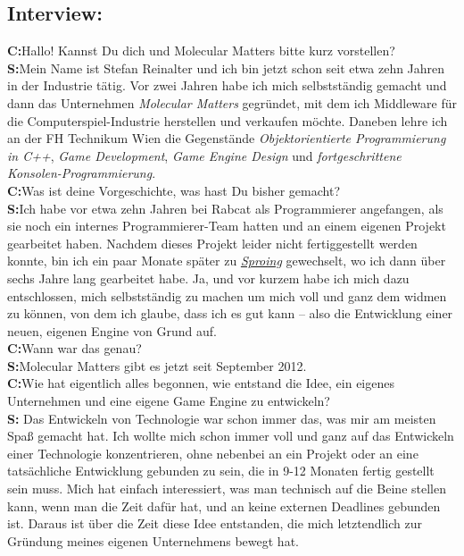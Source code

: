\documentclass[10pt,a4paper,ngerman,twoside]{article} %
\begin{document}
\subsection*{Interview:}
\textbf{C:}Hallo! Kannst Du dich und Molecular Matters bitte kurz vorstellen? \\
\textbf{S:}Mein Name ist Stefan Reinalter und ich bin jetzt schon seit etwa zehn Jahren in der Industrie tätig. Vor zwei Jahren habe ich mich selbstständig gemacht und dann das Unternehmen \textit{Molecular Matters} gegründet, mit dem ich Middleware für die Computerspiel-Industrie herstellen und verkaufen möchte. Daneben lehre ich an der FH Technikum Wien die Gegenstände \textit{Objektorientierte Programmierung in C++},  \textit{Game Development}, \textit{Game Engine Design} und \textit{fortgeschrittene Konsolen-Programmierung}. \\
\textbf{C:}Was ist deine Vorgeschichte, was hast Du bisher gemacht? \\
\textbf{S:}Ich habe vor etwa zehn Jahren bei Rabcat als Programmierer angefangen, als sie noch ein internes Programmierer-Team hatten und an einem eigenen Projekt gearbeitet haben. Nachdem dieses Projekt leider nicht fertiggestellt werden konnte, bin ich ein paar Monate später zu \href{http://www.sproing.com}{\textit{Sproing}} gewechselt, wo ich dann über sechs Jahre lang gearbeitet habe. Ja, und vor kurzem habe ich mich dazu entschlossen, mich selbstständig zu machen um mich voll und ganz dem widmen zu können, von dem ich glaube, dass ich es gut kann – also die Entwicklung einer neuen, eigenen Engine von Grund auf. \\
\textbf{C:}Wann war das genau? \\
\textbf{S:}Molecular Matters gibt es jetzt seit September 2012. \\
\textbf{C:}Wie hat eigentlich alles begonnen, wie entstand die Idee, ein eigenes Unternehmen und eine eigene Game Engine zu entwickeln? \\
\textbf{S:} Das Entwickeln von Technologie war schon immer das, was mir am meisten Spaß gemacht hat. Ich wollte mich schon immer voll und ganz auf das Entwickeln einer Technologie konzentrieren, ohne nebenbei an ein Projekt oder an eine tatsächliche Entwicklung gebunden zu sein, die in 9-12 Monaten fertig gestellt sein muss. Mich hat einfach interessiert, was man technisch auf die Beine stellen kann, wenn man die Zeit dafür hat, und an keine externen Deadlines gebunden ist. Daraus ist über die Zeit diese Idee entstanden, die mich letztendlich zur Gründung meines eigenen Unternehmens bewegt hat. \\
\end{document}
